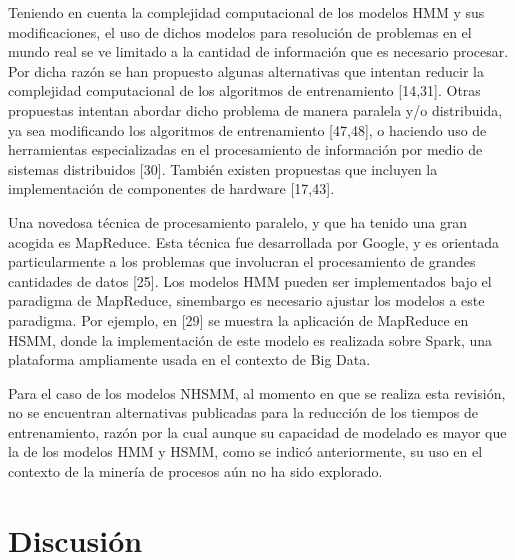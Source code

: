 Teniendo en cuenta la complejidad computacional de los modelos HMM y sus modificaciones, el uso de dichos modelos para resolución de problemas en el mundo real se ve limitado a la cantidad de información que es necesario procesar. Por dicha razón se han propuesto algunas alternativas que intentan reducir la complejidad computacional de los algoritmos de entrenamiento [14,31]. Otras propuestas intentan abordar dicho problema de manera paralela y/o distribuida, ya sea modificando los algoritmos de entrenamiento [47,48], o haciendo uso de herramientas especializadas en el procesamiento de información por medio de sistemas distribuidos [30]. También existen propuestas que incluyen la implementación de componentes de hardware [17,43].

Una novedosa técnica de procesamiento paralelo, y que ha tenido una gran acogida es MapReduce. Esta técnica fue desarrollada por Google, y es orientada particularmente a los problemas que involucran el procesamiento de grandes cantidades de datos [25]. Los modelos HMM pueden ser implementados bajo el paradigma de MapReduce, sinembargo es necesario ajustar los modelos a este paradigma. Por ejemplo, en [29] se muestra la aplicación de MapReduce en HSMM, donde la implementación de este modelo es realizada sobre Spark, una plataforma ampliamente usada en el contexto de Big Data.

Para el caso de los modelos NHSMM, al momento en que se realiza esta revisión, no se encuentran alternativas publicadas para la reducción de los tiempos de entrenamiento, razón por la cual aunque su capacidad de modelado es mayor que la de los modelos HMM y HSMM, como se indicó anteriormente, su uso en el contexto de la minería de procesos aún no ha sido explorado.

\section{Discusión} %
\label{section1.4}

